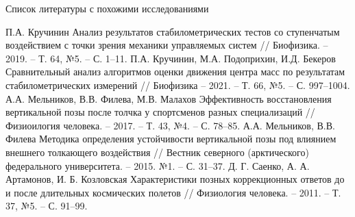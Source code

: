 \documentclass[10pt]{beamer}
\begin{document}
\begin{frame}[shrink=8]{Список литературы с похожими исследованиями}
	\begin{thebibliography}{15}
		П.А. Кручинин Анализ результатов стабилометрических тестов со ступенчатым воздействием с точки зрения механики управляемых систем
		// Биофизика. – 2019. – Т. 64, №5. – С. 1–11.
		П.А. Кручинин, М.А. Подоприхин, И.Д. Бекеров Сравнительный анализ алгоритмов оценки движения центра масс по результатам стабилометрических измерений // Биофизика – 2021. – Т. 66, №5. – С. 997–1004.
		А.А. Мельников, В.В. Филева, М.В. Малахов Эффективность восстановления вертикальной позы
		после толчка у спортсменов разных специализаций // Физиоилогия человека. – 2017. – Т. 43, №4. – С. 78–85.
		А.А. Мельников, В.В. Филева Методика определения устойчивости вертикальной позы под влиянием
		внешнего толкающего воздействия // Вестник северного (арктического) федерального университета. – 2015. №1. – С. 31–37.
		Д. Г. Саенко, А. А. Артамонов, И. Б. Козловская Характеристики позных коррекционных ответов
		до и после длительных космических полетов // Физиология человека. – 2011. – Т. 37, №5. – С. 91–99.
	\end{thebibliography}
\end{frame}
\end{document}
